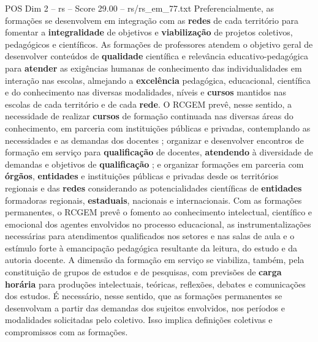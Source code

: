 \begin{textsample}{POS Dim 2 – rs – Score 29.00 – rs/rs\_em\_77.txt}
Preferencialmente, as formações se desenvolvem em integração com as \textbf{redes} de cada território para fomentar a \textbf{integralidade} de objetivos e \textbf{viabilização} de projetos coletivos, pedagógicos e científicos.
As formações de professores atendem o objetivo geral de desenvolver conteúdos de \textbf{qualidade} científica e relevância educativo-pedagógica para \textbf{atender} as exigências humanas de conhecimento das individualidades em interação nas escolas, almejando a \textbf{excelência} pedagógica, educacional, científica e do conhecimento nas diversas modalidades, níveis e \textbf{cursos} mantidos nas escolas de cada território e de cada \textbf{rede}.
O RCGEM prevê, nesse sentido, a necessidade de realizar \textbf{cursos} de formação continuada nas diversas áreas do conhecimento, em parceria com instituições públicas e privadas, contemplando as necessidades e as demandas dos docentes ; organizar e desenvolver encontros de formação em serviço para \textbf{qualificação} de docentes, \textbf{atendendo} à diversidade de demandas e objetivos de \textbf{qualificação} ; e organizar formações em parceria com \textbf{órgãos}, \textbf{entidades} e instituições públicas e privadas desde os territórios regionais e das \textbf{redes} considerando as potencialidades científicas de \textbf{entidades} formadoras regionais, \textbf{estaduais}, nacionais e internacionais.
Com as formações permanentes, o RCGEM prevê o fomento ao conhecimento intelectual, científico e emocional dos agentes envolvidos no processo educacional, as instrumentalizações necessárias para atendimentos qualificados nos setores e nas salas de aula e o estímulo forte à emancipação pedagógica resultante da leitura, do estudo e da autoria docente.
A dimensão da formação em serviço se viabiliza, também, pela constituição de grupos de estudos e de pesquisas, com previsões de \textbf{carga} \textbf{horária} para produções intelectuais, teóricas, reflexões, debates e comunicações dos estudos.
É necessário, nesse sentido, que as formações permanentes se desenvolvam a partir das demandas dos sujeitos envolvidos, nos períodos e modalidades solicitadas pelo coletivo.
Isso implica definições coletivas e compromissos com as formações.

\end{textsample}
